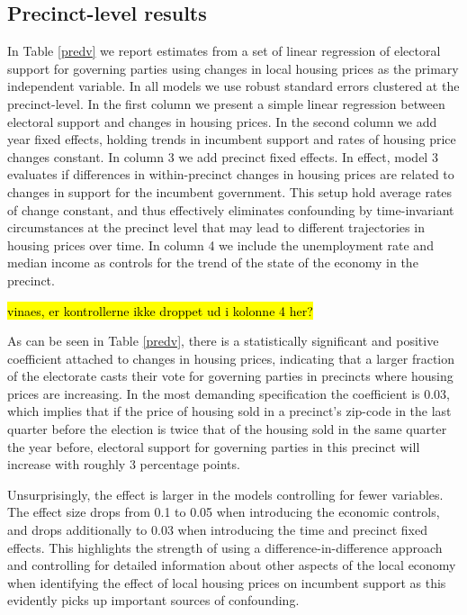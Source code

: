 \documentclass[12pt,a4paper]{article}
\begin{document}
	\subsection{Precinct-level results}
	In Table \ref{predv} we report estimates from a set of linear regression of electoral support for governing parties using changes in local housing prices as the primary independent variable. In all models we use robust standard errors clustered at the precinct-level. In the first column we present a simple linear regression between electoral support and changes in housing prices. In the second column we add year fixed effects, holding trends in incumbent support and rates of housing price changes constant. In column 3 we add precinct fixed effects. In effect, model 3 evaluates if differences in within-precinct changes in housing prices are related to changes in support for the incumbent government. This setup hold average rates of change constant, and thus effectively eliminates confounding by time-invariant circumstances at the precinct level that may lead to different trajectories in housing prices over time. In column 4 we include the unemployment rate and median income as controls for the trend of the state of the economy in the precinct.
	
	\hl{vinaes, er kontrollerne ikke droppet ud i kolonne 4 her?}
	
	
	
	As can be seen in Table \ref{predv}, there is a statistically significant and positive coefficient attached to changes in housing prices, indicating that a larger fraction of the electorate casts their vote for governing parties in precincts where housing prices are increasing. In the most demanding specification the coefficient is 0.03,  which implies that if the price of housing sold in a precinct's zip-code in the last quarter before the election is twice that of the housing sold in the same quarter the year before, electoral support for  governing parties in this precinct will increase with roughly 3 percentage points.
	
	Unsurprisingly, the effect is larger in the models controlling for fewer variables. The effect size drops from 0.1 to 0.05 when introducing the economic controls, and drops additionally to 0.03 when introducing the time and precinct fixed effects. This highlights the strength of using a difference-in-difference approach and controlling for detailed information about other aspects of the local economy when identifying the effect of local housing prices on incumbent support as this evidently picks up important sources of confounding.
\end{document}
